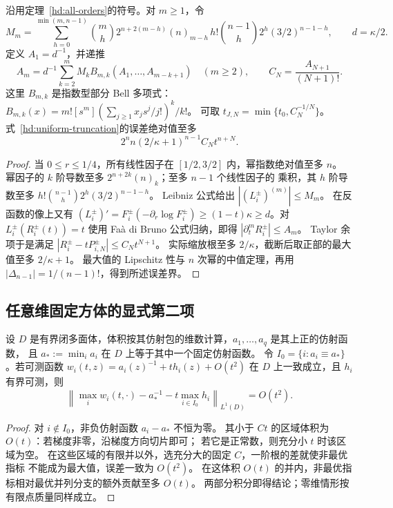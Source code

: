 \begin{proposition}[径向反演的显式误差界]\label{hd:explicit-remainder}
沿用定理~\ref{hd:all-orders}的符号。对 $m\ge1$，令
\[
 M_m=\sum_{h=0}^{\min(m,n-1)}\binom mh
 2^{n+2(m-h)}(n)_{m-h}\,
 h!\binom{n-1}{h}2^h(3/2)^{n-1-h},\qquad d=\kappa/2.
\]
定义 $A_1=d^{-1}$，并递推
\[
 A_m=d^{-1}\sum_{k=2}^mM_k
 B_{m,k}(A_1,\ldots,A_{m-k+1})\quad(m\ge2),\qquad
 C_N=\frac{A_{N+1}}{(N+1)!}.
\]
这里 $B_{m,k}$ 是指数型部分 Bell 多项式：
$B_{m,k}(x)=m![s^m](\sum_{j\ge1}x_js^j/j!)^k/k!$。
可取 $t_{J,N}=\min\{t_0,C_N^{-1/N}\}$。
式~\eqref{hd:uniform-truncation}的误差绝对值至多
\[
 2^nn(2/\kappa+1)^{n-1}C_N t^{n+N}.
\]
\end{proposition}
\begin{proof}
当 $0\le r\le1/4$，所有线性因子在 $[1/2,3/2]$ 内，幂指数绝对值至多 $n$。
幂因子的 $k$ 阶导数至多 $2^{n+2k}(n)_k$；至多 $n-1$ 个线性因子的
乘积，其 $h$ 阶导数至多 $h!\binom{n-1}{h}2^h(3/2)^{n-1-h}$。
Leibniz 公式给出 $|(L_i^\pm)^{(m)}|\le M_m$。
在反函数的像上又有 $(L_i^\pm)'=F_i^\pm(-\partial_r\log F_i^\pm)
\ge(1-t)\kappa\ge d$。对 $L_i^\pm(R_i^\pm(t))=t$ 使用
Fa\`a di Bruno 公式归纳，即得 $|\partial_t^mR_i^\pm|\le A_m$。
Taylor 余项于是满足 $|R_i^\pm-tP_{i,N}^\pm|\le C_Nt^{N+1}$。
实际缩放根至多 $2/\kappa$，截断后取正部的最大值至多 $2/\kappa+1$。
最大值的 Lipschitz 性与 $n$ 次幂的中值定理，再用
$|\Delta_{n-1}|=1/(n-1)!$，得到所述误差界。
\end{proof}

\subsection{任意维固定方体的显式第二项}

\begin{lemma}[角向分支切换的积分余项]\label{hd:switching-lemma}
设 $D$ 是有界闭多面体，体积按其仿射包的维数计算，$a_1,\ldots,a_q$ 是其上正的仿射函数，
且 $a_*:=\min_i a_i$ 在 $D$ 上等于其中一个固定仿射函数。
令 $I_0=\{i:a_i\equiv a_*\}$。若可测函数
$w_i(t,z)=a_i(z)^{-1}+t h_i(z)+O(t^2)$ 在 $D$ 上一致成立，且 $h_i$ 有界可测，则
\[
 \left\|\max_iw_i(t,\cdot)-a_*^{-1}
             -t\max_{i\in I_0}h_i\right\|_{L^1(D)}=O(t^2).
\]
\end{lemma}
\begin{proof}
对 $i\notin I_0$，非负仿射函数 $a_i-a_*$ 不恒为零。
其小于 $Ct$ 的区域体积为 $O(t)$：若梯度非零，沿梯度方向切片即可；
若它是正常数，则充分小 $t$ 时该区域为空。
在这些区域的有限并以外，选充分大的固定 $C$，一阶根的差就使非最优指标
不能成为最大值，误差一致为 $O(t^2)$。
在这体积 $O(t)$ 的并内，非最优指标相对最优并列分支的额外贡献至多 $O(t)$。
两部分积分即得结论；零维情形按有限点质量同样成立。
\end{proof}

